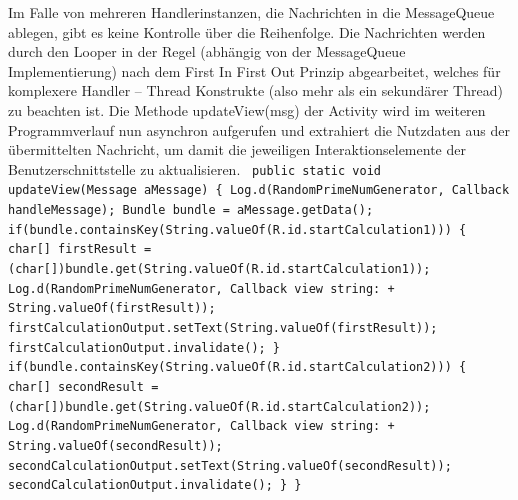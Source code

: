 \documentclass[12pt,oneside,a4paper,bibtotoc,liststotoc]{scrreprt}
\begin{document}
Im Falle von mehreren Handlerinstanzen, die Nachrichten in die MessageQueue ablegen, gibt es keine Kontrolle über die Reihenfolge. Die Nachrichten werden durch den Looper in der Regel (abhängig von der MessageQueue Implementierung) nach dem First In First Out Prinzip abgearbeitet, welches für komplexere Handler – Thread Konstrukte (also mehr als ein sekundärer Thread) zu beachten ist. Die Methode updateView(msg) der Activity wird im weiteren Programmverlauf nun asynchron aufgerufen und extrahiert die Nutzdaten aus der übermittelten Nachricht, um damit die jeweiligen Interaktionselemente der Benutzerschnittstelle zu aktualisieren.\newline\newline
\texttt{ 
  public static void updateView(Message aMessage)\newline
  \{ \newline
     Log.d(\grqq RandomPrimeNumGenerator\grqq, \grqq Callback handleMessage\grqq);\newline
     Bundle bundle = aMessage.getData();\newline
\newline
     if(bundle.containsKey(String.valueOf(R.id.startCalculation1)))\newline
     \{\newline
        char[] firstResult = (char[])bundle.get(String.valueOf(R.id.startCalculation1));\newline
        Log.d(\grqq RandomPrimeNumGenerator\grqq, \grqq Callback view string: \grqq + String.valueOf(firstResult));\newline
\newline
        firstCalculationOutput.setText(String.valueOf(firstResult));\newline
        firstCalculationOutput.invalidate();\newline
    \}\newline
\newline
     if(bundle.containsKey(String.valueOf(R.id.startCalculation2)))\newline
     \{\newline
        char[] secondResult = (char[])bundle.get(String.valueOf(R.id.startCalculation2));\newline
        Log.d(\grqq RandomPrimeNumGenerator\grqq, \grqq Callback view string: \grqq +                                                                                                                                                                 
      String.valueOf(secondResult));\newline\newline
        secondCalculationOutput.setText(String.valueOf(secondResult));\newline
        secondCalculationOutput.invalidate();\newline
     \}\newline
  \}\newline
}\newline
\end{document}
